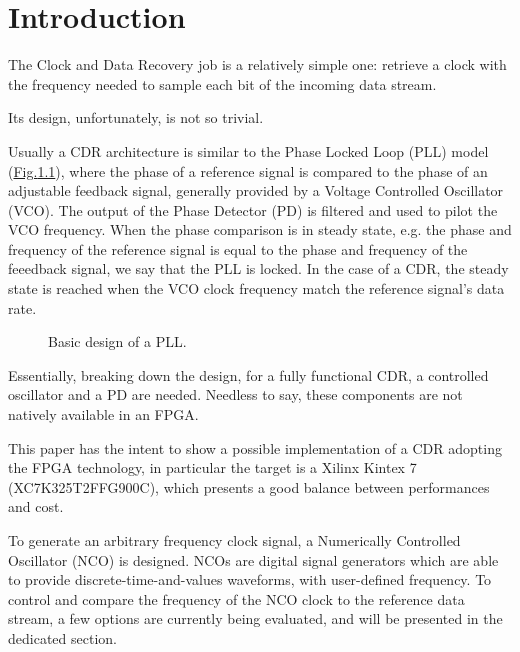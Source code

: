 \documentclass[letterpaper,10pt,english,openany,oneside]{sphinxmanual}
\begin{document}
\chapter{Introduction}
\label{\detokenize{paper/intro:introduction}}\label{\detokenize{paper/intro::doc}}
\begin{DUlineblock}{0em}
\item[] The Clock and Data Recovery job is a relatively simple one: retrieve a clock with the frequency needed to sample each bit of the incoming data stream.
\item[] Its design, unfortunately, is not so trivial.
\end{DUlineblock}

Usually a CDR architecture is similar to the Phase Locked Loop (PLL) model (\hyperref[\detokenize{paper/intro:pll-basic}]{Fig.\@ \ref{\detokenize{paper/intro:pll-basic}}}), where the phase of a reference signal is compared to the phase of an adjustable feedback signal, generally provided by a Voltage Controlled Oscillator (VCO). The output of the Phase Detector (PD) is filtered and used to pilot the VCO frequency. When the phase comparison is in steady state, e.g. the phase and frequency of the reference signal is equal to the phase and frequency of the feeedback signal, we say that the PLL is locked. In the case of a CDR, the steady state is reached when the VCO clock frequency match the reference signal’s data rate.

\begin{figure}[htbp]
\centering
\capstart

\noindent{}
\caption{Basic design of a PLL.}\label{\detokenize{paper/intro:id1}}\label{\detokenize{paper/intro:pll-basic}}\end{figure}

Essentially, breaking down the design, for a fully functional CDR, a controlled oscillator and a PD are needed. Needless to say, these components are not natively available in an FPGA.

This paper has the intent to show a possible implementation of a CDR adopting the FPGA technology, in particular the target is a Xilinx Kintex 7 (XC7K325T\textendash{}2FFG900C), which presents a good balance between performances and cost.

To generate an arbitrary frequency clock signal, a Numerically Controlled Oscillator (NCO) is designed. NCOs are digital signal generators which are able to provide discrete-time-and-values waveforms, with user-defined frequency. To control and compare the frequency of the NCO clock to the reference data stream, a few options are currently being evaluated, and will be presented in the dedicated section.
\end{document}
